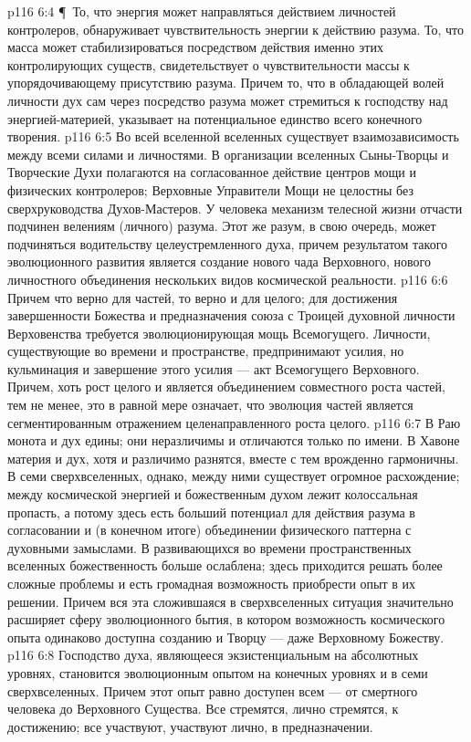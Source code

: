 \vs p116 6:4 \P\ То, что энергия может направляться действием личностей контролеров, обнаруживает чувствительность энергии к действию разума. То, что масса может стабилизироваться посредством действия именно этих контролирующих существ, свидетельствует о чувствительности массы к упорядочивающему присутствию разума. Причем то, что в обладающей волей личности дух сам через посредство разума может стремиться к господству над энергией\hyp{}материей, указывает на потенциальное единство всего конечного творения.
\vs p116 6:5 Во всей вселенной вселенных существует взаимозависимость между всеми силами и личностями. В организации вселенных Сыны\hyp{}Творцы и Творческие Духи полагаются на согласованное действие центров мощи и физических контролеров; Верховные Управители Мощи не целостны без сверхруководства Духов\hyp{}Мастеров. У человека механизм телесной жизни отчасти подчинен велениям (личного) разума. Этот же разум, в свою очередь, может подчиняться водительству целеустремленного духа, причем результатом такого эволюционного развития является создание нового чада Верховного, нового личностного объединения нескольких видов космической реальности.
\vs p116 6:6 Причем что верно для частей, то верно и для целого; для достижения завершенности Божества и предназначения союза с Троицей духовной личности Верховенства требуется эволюционирующая мощь Всемогущего. Личности, существующие во времени и пространстве, предпринимают усилия, но кульминация и завершение этого усилия --- акт Всемогущего Верховного. Причем, хоть рост целого и является объединением совместного роста частей, тем не менее, это в равной мере означает, что эволюция частей является сегментированным отражением целенаправленного роста целого.
\vs p116 6:7 В Раю монота и дух едины; они неразличимы и отличаются только по имени. В Хавоне материя и дух, хотя и различимо разнятся, вместе с тем врожденно гармоничны. В семи сверхвселенных, однако, между ними существует огромное расхождение; между космической энергией и божественным духом лежит колоссальная пропасть, а потому здесь есть больший потенциал для действия разума в согласовании и (в конечном итоге) объединении физического паттерна с духовными замыслами. В развивающихся во времени пространственных вселенных божественность больше ослаблена; здесь приходится решать более сложные проблемы и есть громадная возможность приобрести опыт в их решении. Причем вся эта сложившаяся в сверхвселенных ситуация значительно расширяет сферу эволюционного бытия, в котором возможность космического опыта одинаково доступна созданию и Творцу --- даже Верховному Божеству.
\vs p116 6:8 Господство духа, являющееся экзистенциальным на абсолютных уровнях, становится эволюционным опытом на конечных уровнях и в семи сверхвселенных. Причем этот опыт равно доступен всем --- от смертного человека до Верховного Существа. Все стремятся, лично стремятся, к достижению; все участвуют, участвуют лично, в предназначении.
